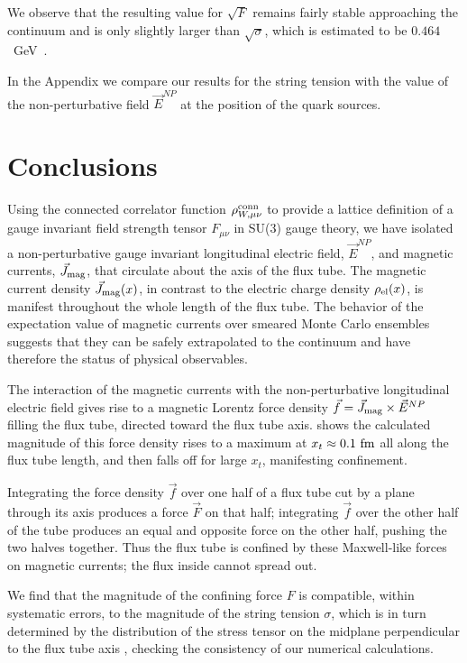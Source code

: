\documentclass[pdftex,twocolumn,epjc3,envcountsect]{svjour3}
\begin{document}
We observe that the resulting value for $\sqrt{F}$ remains fairly stable approaching the continuum and is only slightly larger than $\sqrt{\sigma}$, which is estimated to be
$0.464$~GeV~\cite{Necco:2001xg}. 

In the Appendix  we compare our results for the string tension with the value of the non-perturbative field $\vec{E}^{NP}$ at the position of the quark sources.




\section{Conclusions}
\label{sec:conclusion}

Using the connected correlator function $\rho_{W, \mu \nu}^{\rm conn} $ to provide a lattice definition of a gauge invariant field strength tensor $F_{\mu \nu}$ in SU(3) gauge theory, we have isolated
a non-perturbative gauge invariant longitudinal electric field, $\vec E^{NP}$, and magnetic currents,  $\vec J_{\rm mag}$, that circulate about the axis of the flux tube.  The magnetic current density $\vec{J}_{\rm mag} (x)$, in contrast to the electric charge density $\rho_{\rm el} (x)$, is manifest throughout the whole length of the flux tube.
The behavior of the expectation value of magnetic currents over smeared Monte Carlo ensembles suggests that they can be safely extrapolated to the continuum and have therefore the status of physical observables. 

The interaction of the magnetic currents with the non-perturbative longitudinal electric field gives rise to a magnetic Lorentz force density $\vec f=\vec J_{\rm mag} \times \vec E^{NP}~$filling the flux tube, directed toward the flux tube axis.  shows the calculated magnitude of this  force density  rises to a maximum at $x_t \approx 0.1~ \rm{fm}$ all along the flux tube length, and then falls off for large $x_t$, manifesting confinement.

 Integrating the force density $\vec f$ over one half of a flux tube cut by a plane through its axis produces a force $\vec{F}$ on that half; integrating $\vec f$ over the other half of the tube produces an equal and opposite force on the other half, pushing the two halves together. Thus the flux tube is confined by these Maxwell-like forces on magnetic currents; the flux inside cannot spread out.
  
We find that the magnitude of the confining force $F$ is compatible, within systematic errors, to the magnitude  of the string tension $\sigma$, which is in turn determined by the distribution of the stress tensor on the  midplane perpendicular to the flux tube axis , checking the consistency of our numerical calculations.
\end{document}
